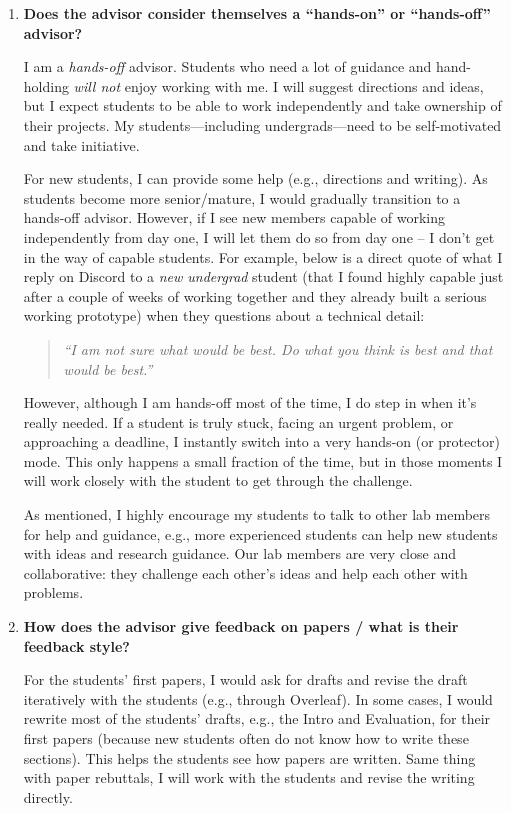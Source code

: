 \documentclass{article}
\begin{document}
\begin{enumerate}[label=\arabic*.]
    \item \textbf{Does the advisor consider themselves a ``hands-on'' or ``hands-off'' advisor?}  

    I am a \textit{hands-off} advisor. Students who need a lot of guidance and hand-holding \emph{will not} enjoy working with me.  
    I will suggest directions and ideas, but I expect students to be able to work independently and take ownership of their projects. My students---including undergrads---need to be self-motivated and take initiative.  
    
    For new students, I can provide some help (e.g., directions and writing). As students become more senior/mature, I would gradually transition to a hands-off advisor. However, if I see new members capable of working independently from day one, I will let them do so from day one -- I don't get in the way of capable students. For example, below is a direct quote of what I reply on Discord to a \textit{new undergrad} student (that I found highly capable just after a couple of weeks of working together and they already built a serious working prototype) when they questions about a technical detail:
    \begin{quote}
    \textit{``I am not sure what would be best. Do what you think is best and that would be best.''}
    \end{quote}

    However, although I am hands-off most of the time, I do step in when it's really needed. If a student is truly stuck, facing an urgent problem, or approaching a deadline, I instantly switch into a very hands-on (or protector) mode. This only happens a small fraction of the time, but in those moments I will work closely with the student to get through the challenge.
    
    As mentioned, I highly encourage my students to talk to other lab members for help and guidance, e.g., more experienced students can help new students with ideas and research guidance. Our lab members are very close and collaborative: they challenge each other's ideas and help each other with problems.

    \item \textbf{How does the advisor give feedback on papers / what is their feedback style?}  
    
    For the students' first papers, I would ask for drafts and revise the draft iteratively with the students (e.g., through Overleaf). In some cases, I would rewrite most of the students' drafts, e.g., the Intro and Evaluation, for their first papers (because new students often do not know how to write these sections). This helps the students see how papers are written. Same thing with paper rebuttals, I will work with the students and revise the writing directly.  
    

\end{enumerate}
\end{document}
